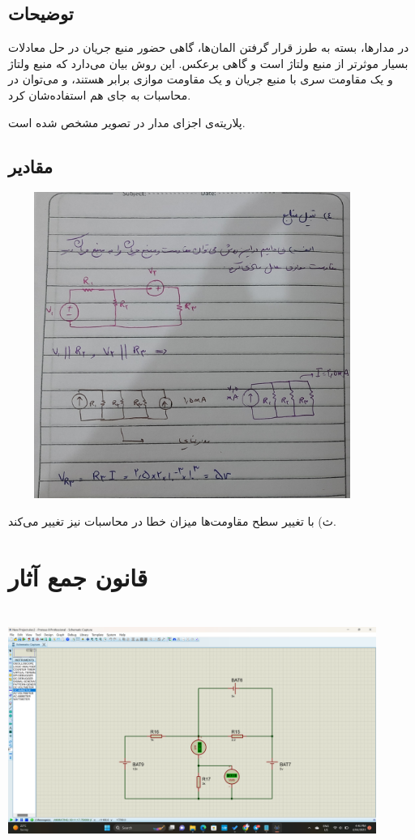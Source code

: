 \documentclass{article}
\begin{document}
		\subsection{توضیحات}
			در مدار‌ها، بسته به طرز قرار گرفتن المان‌ها، گاهی حضور منبع جریان در حل معادلات بسیار موثرتر از منبع ولتاژ است و گاهی برعکس. این روش بیان می‌دارد که منبع ولتاژ و یک مقاومت سری با منبع جریان و یک مقاومت موازی برابر هستند، و می‌توان در محاسبات به جای هم استفاده‌شان کرد.
			
			پلاریته‌ی اجزای مدار در تصویر مشخص شده است.
		\subsection{مقادیر}
			\begin{center}
				\includegraphics[width=12cm, height=10cm]{./images/4}
			\end{center}
		
			ث) با تغییر سطح مقاومت‌‌ها میزان خطا در محاسبات نیز تغییر می‌کند.
	\clearpage
	\section{قانون جمع آثار}
		\begin{center}
			\includegraphics[width=12cm, height=8cm]{./images/3_3}
		\end{center}
		
\end{document}
